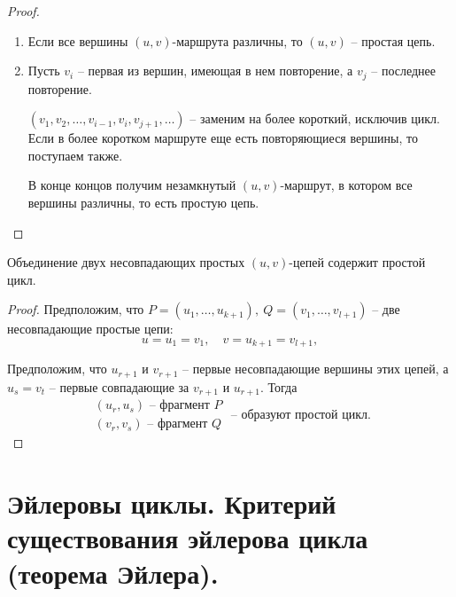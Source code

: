 \begin{proof}\leavevmode
    \begin{enumerate}
        \item Если все вершины $ (u,v) $-маршрута различны, то $ (u,v) $ -- простая цепь.
        \item Пусть $ v_i $ -- первая из вершин, имеющая в нем повторение, а $ v_j $ -- последнее повторение.
              \begin{figure}[H]
                  \centering
                  \label{fig:fig_07}
              \end{figure}

              $ (v_1,v_2,\ldots,v_{i-1},v_i,v_{j+1},\ldots) $ -- заменим на более короткий, исключив цикл. Если в более коротком маршруте еще есть повторяющиеся вершины, то поступаем также.

              В конце концов получим незамкнутый $ (u,v) $-маршрут, в котором все вершины различны, то есть простую цепь.
    \end{enumerate}
\end{proof}

\begin{lemma}
    Объединение двух несовпадающих простых $ (u,v) $-цепей содержит простой цикл.
\end{lemma}

\begin{proof}
    Предположим, что $ P = (u_1,\ldots,u_{k+1}), \ Q = (v_1,\ldots,v_{l+1}) $ -- две несовпадающие простые цепи:
    \[
        u = u_1 = v_1, \quad v = u_{k+1} = v_{l+1},
    \]
    \begin{figure}[H]
        \centering
        \label{fig:fig_08}
    \end{figure}

    Предположим, что $ u_{r+1} $ и $ v_{r+1} $ -- первые несовпадающие вершины этих цепей, а $ u_s = v_t $ -- первые совпадающие за $ v_{r+1} $ и $ u_{r+1} $. Тогда
    \[
        \begin{array}{l}
            (u_r,u_s) \text{ -- фрагмент } P \\
            (v_r,v_s) \text{ -- фрагмент } Q
        \end{array} \text{ -- образуют простой цикл.}
    \]
\end{proof}

\section{Эйлеровы циклы. Критерий существования эйлерова цикла (теорема Эйлера).}

